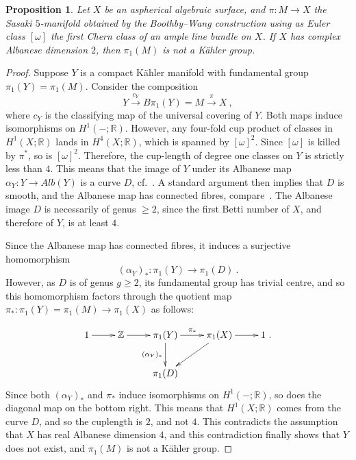 \documentclass[12pt,leqno]{amsart}
\newcommand{\R}{\mathbb{R}}
\newcommand{\Z}{\mathbb{Z}}
\newtheorem{prop}[theor]{Proposition}
\begin{document}
\begin{prop}\label{tAlb}
Let $X$ be an aspherical algebraic surface, and $\pi\colon M\longrightarrow X$ the Sasaki 
$5$-manifold obtained by the Boothby--Wang construction using as Euler class $[\omega ]$ the first
Chern class of an ample line bundle on $X$.
If $X$ has complex Albanese dimension $2$, then $\pi_1(M)$ is not a K\"ahler group.
\end{prop}
\begin{proof}
Suppose $Y$ is a compact K\"ahler manifold with fundamental group $\pi_1(Y)=\pi_1(M)$.
Consider the composition
$$
Y \stackrel{c_Y}{\longrightarrow} B\pi_1(Y) = M \stackrel{\pi}{\longrightarrow} X \ ,
$$
where $c_Y$ is the classifying map of the universal covering of $Y$. Both maps 
induce isomorphisms on $H^1 (-;\R)$. However, any four-fold cup product of classes
in $H^1 (X;\R)$ lands in $H^4(X;\R)$, which is spanned by $[\omega ]^2$.
Since $[\omega ]$ is killed by $\pi^*$, so is $[\omega ]^2$. Therefore, the cup-length 
of degree one classes on $Y$ is strictly less than $4$. This means that the 
image of $Y$ under its Albanese map $\alpha_Y\colon Y\longrightarrow Alb(Y)$ 
is a curve $D$, cf.~\cite[p.~23]{ABCKT}.  
A standard argument then implies that $D$ is smooth, and the 
Albanese map has connected fibres, compare~\cite[p.~289]{F}. 
The Albanese image $D$ is necessarily of genus $\geq 2$,
since the first Betti number of $X$, and therefore of $Y$, is at least $4$. 

Since the Albanese map has connected fibres, it induces a surjective homomorphism 
$$
(\alpha_Y)_*\colon\pi_1(Y)\longrightarrow\pi_1(D) \ .
$$
However, as $D$ is of genus $g\geq 2$, its fundamental group has 
trivial centre, and so this homomorphism factors through the quotient map 
$\pi_*\colon\pi_1(Y)=\pi_1(M)\longrightarrow\pi_1(X)$ as follows:

\begin{equation}\label{AlbDim}
\xymatrix{1 \ar[r] & \Z \ar[r] & \pi_1(Y)\ar[d]_{(\alpha_Y)_*}  \ar[r]^{\pi_*} &  \pi_1(X) \ar[dl]  \ar[r] & 1 \ .\\ 
 & & \pi_1(D) 
}
\end{equation}
Since both $(\alpha_Y)_*$ and $\pi_*$ induce isomorphisms on $H^1 (-;\R)$, so does the 
diagonal map on the bottom right. This means that $H^1 (X;\R)$ comes from the curve $D$,
and so the cuplength is $2$, and not $4$. This contradicts the assumption that $X$ has 
real Albanese dimension $4$, and this contradiction finally shows that $Y$ does not exist,
and $\pi_1(M)$ is not a K\"ahler group.
\end{proof}
\end{document}
